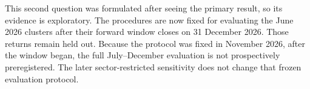 This second question was formulated after seeing the primary result, so its evidence is exploratory. The procedures are now fixed for evaluating the June 2026 clusters after their forward window closes on 31 December 2026. Those returns remain held out. Because the protocol was fixed in November 2026, after the window began, the full July--December evaluation is not prospectively preregistered. The later sector-restricted sensitivity does not change that frozen evaluation protocol.

